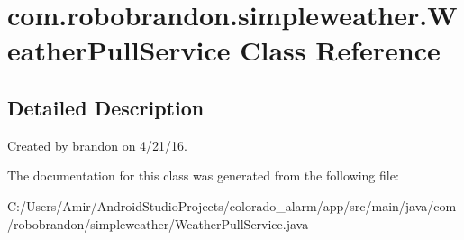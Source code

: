 \hypertarget{classcom_1_1robobrandon_1_1simpleweather_1_1_weather_pull_service}{}\section{com.\+robobrandon.\+simpleweather.\+Weather\+Pull\+Service Class Reference}
\label{classcom_1_1robobrandon_1_1simpleweather_1_1_weather_pull_service}


\subsection{Detailed Description}
Created by brandon on 4/21/16. 

The documentation for this class was generated from the following file\+:\begin{DoxyCompactItemize}
\item 
C\+:/\+Users/\+Amir/\+Android\+Studio\+Projects/colorado\+\_\+alarm/app/src/main/java/com/robobrandon/simpleweather/Weather\+Pull\+Service.\+java\end{DoxyCompactItemize}
